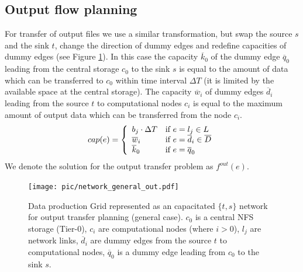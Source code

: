 \documentclass{svjour3}                     %
\begin{document}
\subsection{Output flow planning}
\label{outproblem}
For transfer of output files we use a similar transformation, but swap the
source $s$ and the sink $t$, change the direction of dummy edges and redefine
capacities of dummy edges (see Figure \ref{general_out}). In this case the capacity $\overline{k}_{0}$ of the
dummy edge $\overline{q}_{0}$ leading from the central storage $c_0$ to the
sink $s$ is equal to the amount of data which can be transferred to $c_0$
within time interval $\Delta T$ (it is limited by the available space at the
central storage). The capacity $\overline{w}_{i}$ of dummy edges
$\overline{d}_{i}$ leading from the source $t$ to computational nodes $c_{i}$
is equal to the maximum amount of output data which can be transferred from
the node $c_{i}$.
%
\begin{equation}
\label{edge_cap_out}
cap(e) = \left\{ 
  \begin{array}{l l}
    b_{j} \cdot \Delta T & \text{if }e = l_{j} \in L \\
    \overline{w}_{i} & \text{if } e = \overline{d}_{i} \in \overline{D}\\
    \overline{k}_{0} & \text{if } e = \overline{q}_{0}
  \end{array} \right.
\end{equation}
%
We denote the solution for the output transfer problem as $f^{out}(e)$.
\begin{figure}[b]
	\begin{center}
		\texttt{[image: pic/network\_general\_out.pdf]}
	\end{center}
	\caption{Data production Grid represented as an capacitated $\{t,s\}$ network for output transfer planning (general case). $c_{0}$ is a central NFS storage (Tier-0), $c_{i}$ are computational nodes (where $i>0$), $l_{j}$ are network links, $\overline{d}_{i}$ are dummy edges from the source $t$ to computational nodes, $\overline{q}_{0}$ is a dummy edge leading from $c_{0}$ to the sink $s$. }
	\label{general_out}	
\end{figure}
\end{document}
